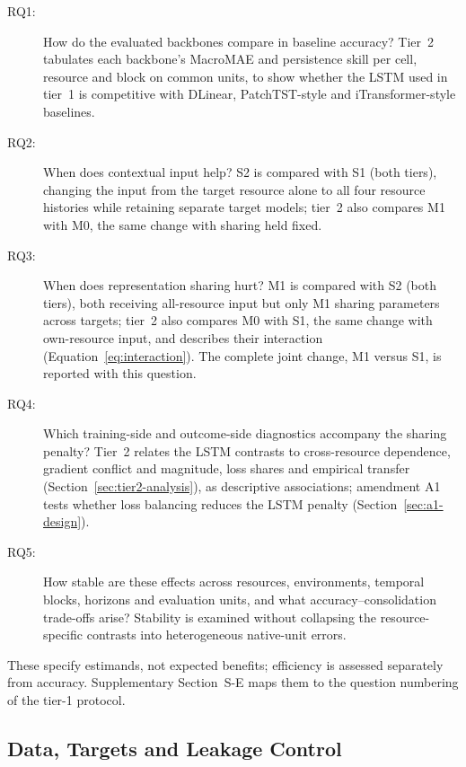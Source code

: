 \documentclass[5p,twocolumn]{elsarticle}
\begin{document}
\begin{description}
  \item[RQ1:] How do the evaluated backbones compare in baseline accuracy?
    Tier~2 tabulates each backbone's MacroMAE and persistence skill per cell,
    resource and block on common units, to show whether the LSTM used in
    tier~1 is competitive with DLinear, PatchTST-style and
    iTransformer-style baselines.
  \item[RQ2:] When does contextual input help? S2 is compared with S1 (both
    tiers), changing the input from the target resource alone to all four
    resource histories while retaining separate target models; tier~2 also
    compares M1 with M0, the same change with sharing held fixed.
  \item[RQ3:] When does representation sharing hurt? M1 is compared with S2
    (both tiers), both receiving all-resource input but only M1 sharing
    parameters across targets; tier~2 also compares M0 with S1, the same
    change with own-resource input, and describes their interaction
    (Equation~\ref{eq:interaction}). The complete joint change, M1 versus S1,
    is reported with this question.
  \item[RQ4:] Which training-side and outcome-side diagnostics accompany the
    sharing penalty? Tier~2 relates the LSTM contrasts to cross-resource
    dependence, gradient conflict and magnitude, loss shares and empirical
    transfer (Section~\ref{sec:tier2-analysis}), as descriptive associations;
    amendment A1 tests whether loss balancing reduces the LSTM penalty
    (Section~\ref{sec:a1-design}).
  \item[RQ5:] How stable are these effects across resources, environments,
    temporal blocks, horizons and evaluation units, and what
    accuracy--consolidation trade-offs arise? Stability is examined without
    collapsing the resource-specific contrasts into heterogeneous native-unit
    errors.
\end{description}

These specify estimands, not expected benefits; efficiency is assessed
separately from accuracy. Supplementary Section~S-E maps them to the
question numbering of the tier-1 protocol.

\subsection{Data, Targets and Leakage Control}
\label{sec:datasets}
\label{sec:preprocessing}
\label{sec:leakage-control}
\label{sec:population-restrictions}
\label{sec:replication-design}
\end{document}
